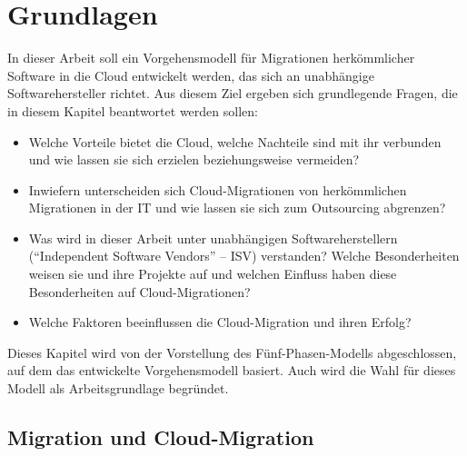 \section{Grundlagen}
\label{cha:grundlagen}

In dieser Arbeit soll ein Vorgehensmodell für Migrationen herkömmlicher 
Software in die Cloud entwickelt werden, das sich an unabhängige 
Softwarehersteller richtet. Aus diesem Ziel ergeben sich grundlegende Fragen, 
die in diesem Kapitel beantwortet werden sollen:
\begin{itemize}
	\item Welche Vorteile bietet die Cloud, welche Nachteile sind mit ihr verbunden und wie lassen sie sich
erzielen beziehungsweise vermeiden? 
	\item Inwiefern unterscheiden sich Cloud-Migrationen von herkömmlichen
Migrationen in der IT und wie lassen sie sich zum Outsourcing abgrenzen? 
	\item Was wird in dieser Arbeit unter unabhängigen 
Softwareherstellern ("`Independent Software Vendors"' -- ISV)  
verstanden? Welche Besonderheiten weisen sie und ihre Projekte auf und welchen
Einfluss haben diese Besonderheiten auf Cloud-Migrationen?
	\item Welche Faktoren beeinflussen die Cloud-Migration und ihren
Erfolg?
\end{itemize}
Dieses Kapitel wird von der Vorstellung des Fünf-Phasen-Modells abgeschlossen,
auf dem das entwickelte Vorgehensmodell basiert. Auch wird die Wahl für dieses
Modell als Arbeitsgrundlage begründet.

\subsection{Migration und Cloud-Migration}
\label{cha:definition_cloud-migration}


